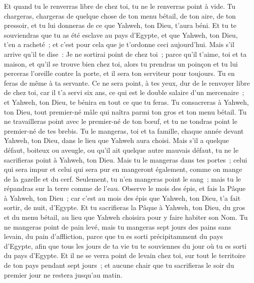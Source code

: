 \begin{multicols}{2}
Et quand tu le renverras libre de chez toi, tu ne le renverras point à vide.
Tu chargeras, chargeras de quelque chose de ton menu bétail, de ton aire, de ton pressoir, et tu lui donneras de ce que Yahweh, ton Dieu, t'aura béni.
Et tu te souviendras que tu as été esclave au pays d'Egypte, et que Yahweh, ton Dieu, t'en a racheté~; et c'est pour cela que je t'ordonne ceci aujourd'hui.
Mais s'il arrive qu'il te dise~: Je ne sortirai point de chez toi~; parce qu'il t'aime, toi et ta maison, et qu'il se trouve bien chez toi,
alors tu prendras un poinçon et tu lui perceras l'oreille contre la porte, et il sera ton serviteur pour toujours. Tu en feras de même à ta servante.
Ce ne sera point, à tes yeux, dur de le renvoyer libre de chez toi, car il t'a servi six ans, ce qui est le double salaire d'un mercenaire~; et Yahweh, ton Dieu, te bénira en tout ce que tu feras.
Tu consacreras à Yahweh, ton Dieu, tout premier-né mâle qui naîtra parmi ton gros et ton menu bétail. Tu ne travailleras point avec le premier-né de ton bœuf, et tu ne tondras point le premier-né de tes brebis.
Tu le mangeras, toi et ta famille, chaque année devant Yahweh, ton Dieu, dans le lieu que Yahweh aura choisi.
Mais s'il a quelque défaut, boiteux ou aveugle, ou qu'il ait quelque autre mauvais défaut, tu ne le sacrifieras point à Yahweh, ton Dieu.
Mais tu le mangeras dans tes portes~; celui qui sera impur et celui qui sera pur en mangeront également, comme on mange de la gazelle et du cerf.
Seulement, tu n'en mangeras point le sang~; mais tu le répandras sur la terre comme de l'eau.
\VerseOne{}Observe le mois des épis, et fais la Pâque à Yahweh, ton Dieu~; car c'est au mois des épis que Yahweh, ton Dieu, t'a fait sortir, de nuit, d'Egypte.
Et tu sacrifieras la Pâque à Yahweh, ton Dieu, du gros et du menu bétail, au lieu que Yahweh choisira pour y faire habiter son Nom.
Tu ne mangeras point de pain levé, mais tu mangeras sept jours des pains sans levain, du pain d'affliction, parce que tu es sorti précipitamment du pays d'Egypte, afin que tous les jours de ta vie tu te souviennes du jour où tu es sorti du pays d'Egypte.
Et il ne se verra point de levain chez toi, sur tout le territoire de ton pays pendant sept jours~; et aucune chair que tu sacrifieras le soir du premier jour ne restera jusqu'au matin.

\end{multicols}
